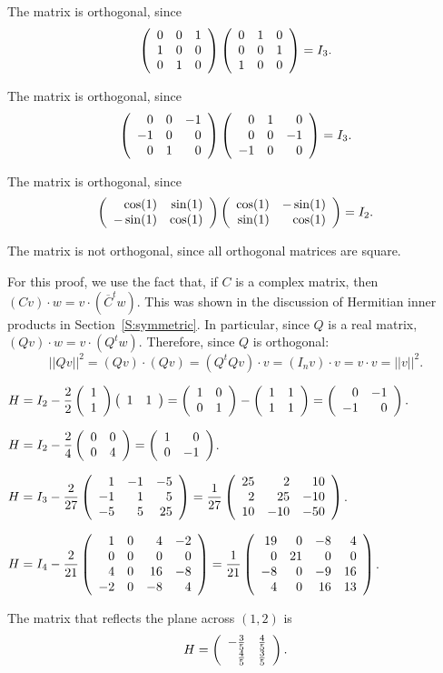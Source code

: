  \ans The matrix is orthogonal, since
\[
\left(\begin{array}{rrr} 0 & 0 & 1 \\ 1 & 0 & 0 \\ 0 & 1 & 0\end{array}\right)
\left(\begin{array}{rrr} 0 & 1 & 0 \\ 0 & 0 & 1 \\ 1 & 0 & 0\end{array}\right) =
I_3.
\]

 The matrix is orthogonal, since
\[
\left(\begin{array}{rrr} 0 & 0 & -1 \\ -1 & 0 & 0 \\ 0 & 1 & 0\end{array}\right)
\left(\begin{array}{rrr} 0 & 1 & 0 \\ 0 & 0 & -1 \\ -1 & 0 & 0\end{array}\right) =
I_3.
\]

 The matrix is orthogonal, since
\[
\left(\begin{array}{rr} \cos(1) & \sin(1)\\ -\sin(1) &\cos(1)\end{array}\right)
\left(\begin{array}{rr} \cos(1) & -\sin(1)\\ \sin(1) &\cos(1)\end{array}\right)
= I_2.
\]

 The matrix is not orthogonal, since all orthogonal matrices
are square.

For this proof, we use the fact that, if $C$ is a complex matrix, then
$(Cv) \cdot w = v \cdot (\overline{C}^tw)$.  This was shown in the discussion
of Hermitian inner products in Section~\ref{S:symmetric}.  In particular,
since $Q$ is a real matrix, $(Qv) \cdot w = v \cdot (Q^tw)$.  Therefore,
since $Q$ is orthogonal:
\[
||Qv||^2 = (Qv) \cdot (Qv) = (Q^tQv) \cdot v = (I_nv) \cdot v
= v \cdot v = ||v||^2.
\]

\newpage
{}
$H = I_2 - \displaystyle\frac{2}{2}\left(\begin{array}{r} 1 \\ 1\end{array}\right)\left(\begin{array}{rr} 1 & 1
\end{array}\right) = \left(\begin{array}{rr} 1 & 0\\ 0 &1\end{array}\right) - \left(\begin{array}{rr} 1 & 1\\ 1 &1\end{array}\right)
= \left(\begin{array}{rr} 0 & -1\\ -1 &0\end{array}\right).$

$H = I_2 - \displaystyle\frac{2}{4}\left(\begin{array}{rr} 0 & 0\\ 0 &4\end{array}\right) =
\left(\begin{array}{rr} 1 & 0\\ 0 &-1\end{array}\right)$.

$H = I_3 - \displaystyle\frac{2}{27}\left(\begin{array}{rrr} 1 & -1 & -5 \\ -1 & 1 & 5 \\ -5 & 5 & 25\end{array}\right)
= \frac{1}{27}\left(\begin{array}{rrr} 25 & 2 & 10 \\ 2 & 25 & -10 \\ 10 & -10 & -50\end{array}\right)$.

$H = I_4 - \displaystyle\frac{2}{21}\left(\begin{array}{rrrr} 1 & 0 & 4 & -2 \\
0 & 0 & 0 & 0 \\ 4 & 0 & 16 & -8 \\ -2 & 0 & -8 & 4 \end{array}\right)
= \frac{1}{21}\left(\begin{array}{rrrr} 19 & 0 & -8 & 4 \\
0 & 21 & 0 & 0 \\ -8 & 0 & -9 & 16 \\ 4 & 0 & 16 & 13
\end{array}\right)$.

\ans The matrix that reflects the plane across $(1,2)$ is
\[
H = \left(\begin{array}{rr} -\frac{3}{5} & \frac{4}{5}\\ \frac{4}{5} &\frac{3}{5}\end{array}\right).
\]

